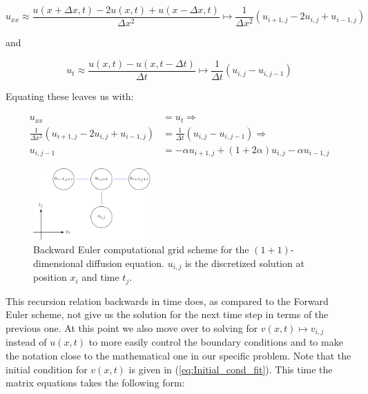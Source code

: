 \documentclass[a4paper, 11pt, notitlepage,english]{article}
\begin{document}
\begin{equation}
u_{xx} \approx \frac{u(x+\Delta x,t)-2u(x,t)+u(x-\Delta x, t)}{\Delta x^2} \mapsto \frac{1}{\Delta x^2} (u_{i+1,j}-2u_{i,j}+u_{i-1,j})
\label{eq:Backward_uxx}
\end{equation}

and

\begin{equation}
u_{t} \approx \frac{u(x,t)-u(x,t-\Delta t)}{\Delta t} \mapsto \frac{1}{\Delta t} (u_{i,j}-u_{i,j-1})
\label{eq:Backward_ut}
\end{equation}

Equating these leaves us with:

\begin{align}
u_{xx} &= u_t \Rightarrow \\
 \frac{1}{\Delta x^2} (u_{i+1,j}-2u_{i,j}+u_{i-1,j}) &= \frac{1}{\Delta t} (u_{i,j}-u_{i,j-1}) \Rightarrow \\
 u_{i,j-1} &= -\alpha u_{i+1,j} + (1+2\alpha)u_{i,j} - \alpha u_{i-1,j}
\label{eq:Backward_Euler_scheme}
\end{align}

\begin{figure}[h!tb]
 \centering
 \includegraphics[width=0.4\textwidth]{Grid_BE-figure0}
 \caption{Backward Euler computational grid scheme for the $(1+1)$-dimensional diffusion equation. $u_{i,j}$ is the discretized solution at position $x_i$ and time $t_j$.}
 \label{fig:BE_grid}
\end{figure}

This recursion relation backwards in time does, as compared to the Forward Euler scheme, not give us the solution for the next time step in terms of the previous one. At this point we also move over to solving for $v(x,t) \mapsto v_{i,j}$ instead of $u(x,t)$ to more easily control the boundary conditions and to make the notation close to the mathematical one in our specific problem. Note that the initial condition for $v(x,t)$ is given in (\ref{eq:Initial_cond_fit}). This time the matrix equations takes the following form:
\end{document}
